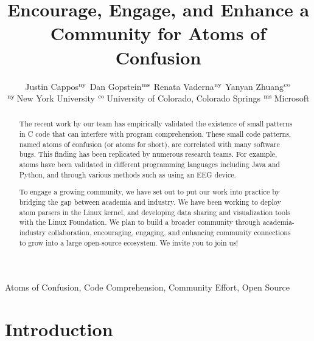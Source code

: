 \documentclass[conference]{IEEEtran}
\begin{document}
\newif\ifrev
\revtrue
\ifrev
  \newcommand{\yanyan}[1]{{\color{blue} [Yanyan: #1]}}
  \newcommand{\red}[1]{\textcolor{red}{#1}}
  \newcommand{\todo}[1]{\textcolor{red}{\textbf{Anyone todo}: #1}}
\else
  \newcommand{\yanyan}[1]{}
  \newcommand{\red}[1]{}
  \newcommand{\todo}[1]{}
\fi

\title{Encourage, Engage, and
Enhance a Community for Atoms of Confusion}

\author{Justin Cappos${}^{\rm ny}$ \qquad Dan Gopstein${}^{\rm ms}$ \qquad Renata Vaderna${}^{\rm ny}$ \qquad Yanyan Zhuang${}^{\rm co}$\\
${}^{\rm ny}$\,New York University \quad 
${}^{\rm co}$\,University of Colorado, Colorado Springs \quad  ${}^{\rm ms}$\,Microsoft %
}

\maketitle

\begin{abstract}
The recent work by our team has empirically 
validated the existence of small patterns in C code
that can interfere with program comprehension.
These small code patterns, named atoms of confusion 
(or atoms for short), are correlated with many software bugs. This finding has been replicated by numerous 
research teams. For example, atoms have been validated in different programming languages including Java and Python, and through various methods such as using an EEG device.

To engage a growing community, we have set out to put our work into practice by bridging the gap between academia and industry. We have been working to deploy atom parsers in the Linux kernel, and developing data sharing and visualization tools with the Linux Foundation. 
We plan to build a broader community through academia-industry collaboration, encouraging, engaging, and enhancing community connections to grow into a large open-source ecosystem. We invite you to join us!
\end{abstract}

\begin{IEEEkeywords}
Atoms of Confusion, Code Comprehension, Community Effort, Open Source
\end{IEEEkeywords}

\section{Introduction}
\end{document}
